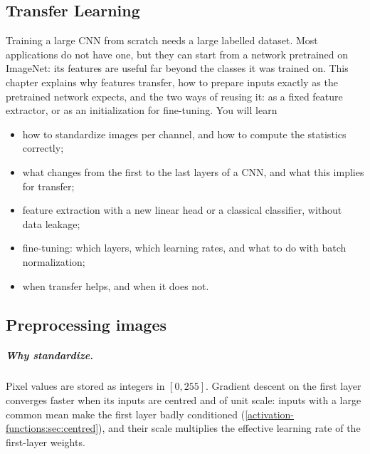 \begin{notechapter}
\chapter{Transfer Learning}\label{ch:transfer-learning}

\begin{chapterintro}
Training a large CNN from scratch needs a large labelled dataset. Most applications do
not have one, but they can start from a network pretrained on ImageNet: its features are
useful far beyond the classes it was trained on. This chapter explains why features
transfer, how to prepare inputs exactly as the pretrained network expects, and the two
ways of reusing it: as a fixed feature extractor, or as an initialization for fine-tuning.
You will learn
\begin{itemize}[nosep]
  \item how to standardize images per channel, and how to compute the statistics correctly;
  \item what changes from the first to the last layers of a CNN, and what this implies for
        transfer;
  \item feature extraction with a new linear head or a classical classifier, without data
        leakage;
  \item fine-tuning: which layers, which learning rates, and what to do with batch
        normalization;
  \item when transfer helps, and when it does not.
\end{itemize}
\end{chapterintro}

\section{Preprocessing images}\label{transfer-learning:sec:preprocessing}

\paragraph{Why standardize.} Pixel values are stored as integers in $[0, 255]$. Gradient
descent on the first layer converges faster when its inputs are centred and of unit scale:
inputs with a large common mean make the first layer badly conditioned
(\cref{activation-functions:sec:centred}), and their scale multiplies the effective learning
rate of the first-layer weights.


\end{notechapter}
